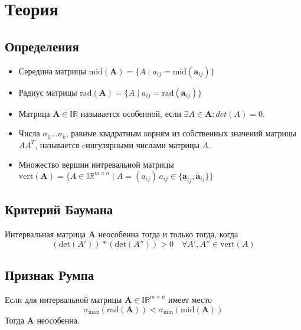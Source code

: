 \section{Теория}
\subsection{Определения}
\begin{itemize}
    \item Середина матрицы $\mathrm{mid}(\textbf{A})=\{A\;|\;a_{ij}=\mathrm{mid}(\textbf{a}_{ij})\}$
    \item Радиус матрицы $\mathrm{rad}(\textbf{A})=\{A\;|\;a_{ij}=\mathrm{rad}(\textbf{a}_{ij})\}$
    \item Матрица $\textbf{A}\in \mathbb{IR}$ называется особенной, если $\exists A \in \textbf{A} : det(A)=0$.
    \item Числа $\sigma_1...\sigma_k$, равные квадратным корням из собственных значений матрицы $AA^T$, называется cингулярными числами матрицы $A$.
    \item Множество вершин интревальной матрицы\\ $\mathrm{vert}(\textbf{A})=\{A\in\mathbb{IR}^{m\times n} \;|\; A=(a_{ij}) \, a_{ij}\in\{\underline{\textbf{a}}_{ij}, \overline{\textbf{a}}_{ij}\}\}$
\end{itemize}
\subsection{Критерий Баумана}
Интервальная матрица $\textbf{A}$ неособенна тогда и только тогда, когда 
\begin{equation}
    (\mathrm{det}(A'))*(\mathrm{det}(A''))>0 \quad \forall A',A''\in \mathrm{vert}(A)
\end{equation}
\subsection{Признак Румпа}
Если для интервальной матрицы $\textbf{A}\in \mathbb{IR}^{m\times n}$ имеет место
\begin{equation}
    \sigma_{\mathrm{max}}(\mathrm{rad}(\textbf{A}))<\sigma_{\mathrm{min}}(\mathrm{mid}(\textbf{A}))
\end{equation}
Тогда $\textbf{A}$ неособенна.


